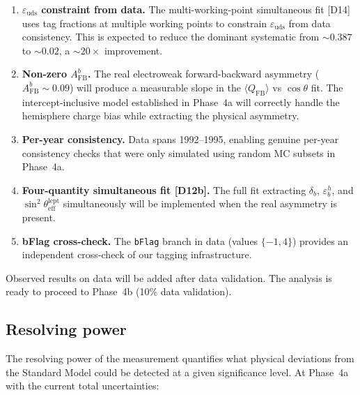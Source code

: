 \documentclass[11pt,a4paper]{article}
\begin{document}
\begin{enumerate}
\item \textbf{$\varepsilon_\mathrm{uds}$ constraint from data.} The multi-working-point
simultaneous fit [D14] uses tag fractions at multiple working points to constrain
$\varepsilon_\mathrm{uds}$ from data consistency. This is expected to reduce the
dominant systematic from $\sim 0.387$ to $\sim 0.02$, a $\sim 20\times$ improvement.

\item \textbf{Non-zero $A_\mathrm{FB}^b$.} The real electroweak forward-backward
asymmetry ($A_\mathrm{FB}^b \sim 0.09$) will produce a measurable slope in the
$\langle Q_\mathrm{FB} \rangle$ vs $\cos\theta$ fit. The intercept-inclusive model
established in Phase~4a will correctly handle the hemisphere charge bias while
extracting the physical asymmetry.

\item \textbf{Per-year consistency.} Data spans 1992--1995, enabling genuine per-year
consistency checks that were only simulated using random MC subsets in Phase~4a.

\item \textbf{Four-quantity simultaneous fit [D12b].} The full fit extracting
$\delta_b$, $\varepsilon_b^h$, and $\sin^2\theta_\mathrm{eff}^\mathrm{lept}$
simultaneously will be implemented when the real asymmetry is present.

\item \textbf{bFlag cross-check.} The \texttt{bFlag} branch in data (values $\{-1, 4\}$)
provides an independent cross-check of our tagging infrastructure.
\end{enumerate}

Observed results on data will be added after data validation. The analysis is ready
to proceed to Phase~4b (10\% data validation).

\subsection{Resolving power}
\label{sec:resolving_power}

The resolving power of the measurement quantifies what physical deviations from the
Standard Model could be detected at a given significance level. At Phase~4a with the
current total uncertainties:
\end{document}
